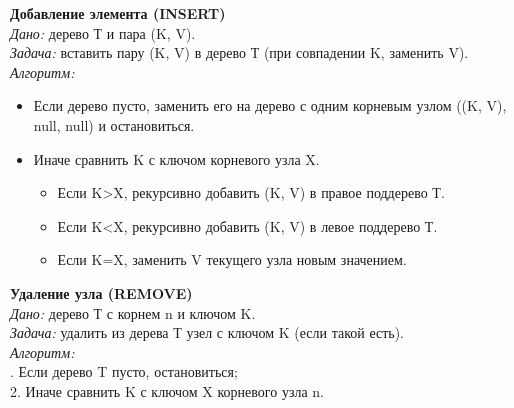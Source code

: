 { \bf Добавление элемента (INSERT)}\\
\textit{Дано:} дерево Т и пара (K, V).\\
\textit{Задача:} вставить пару (K, V) в дерево Т (при совпадении K, заменить V).\\
\textit{Алгоритм:}
\begin{itemize}
\item Если дерево пусто, заменить его на дерево с одним корневым узлом ((K, V), null, null) и остановиться.
\item Иначе сравнить K с ключом корневого узла X.
\begin{itemize}
\item[\labelitemi] Если K>X, рекурсивно добавить (K, V) в правое поддерево Т.
\item[\labelitemi] Если K<X, рекурсивно добавить (K, V) в левое поддерево Т.
\item[\labelitemi] Если K=X, заменить V текущего узла новым значением.
\end{itemize}
\end{itemize}
{ \bf Удаление узла (REMOVE)}\\
\textit{Дано:} дерево Т с корнем n и ключом K.\\
\textit{Задача:} удалить из дерева Т узел с ключом K (если такой есть).\\
\textit{Алгоритм:}\\
 . Если дерево T пусто, остановиться;\\
2. Иначе сравнить K с ключом X корневого узла n.
